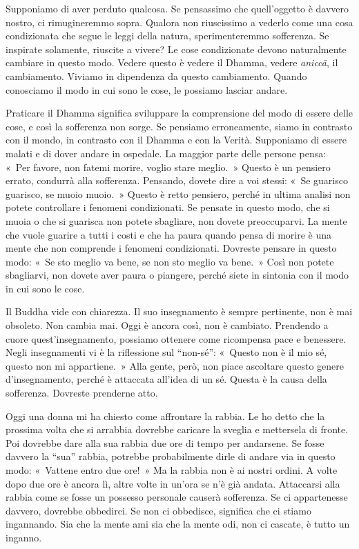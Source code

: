 Supponiamo di aver perduto qualcosa. Se pensassimo che quell'oggetto è
davvero nostro, ci rimugineremmo sopra. Qualora non riuscissimo a
vederlo come una cosa condizionata che segue le leggi della natura,
sperimenteremmo sofferenza. Se inspirate solamente, riuscite a vivere?
Le cose condizionate devono naturalmente cambiare in questo modo. Vedere
questo è vedere il Dhamma, vedere \emph{aniccā}, il cambiamento. Viviamo
in dipendenza da questo cambiamento. Quando conosciamo il modo in cui
sono le cose, le possiamo lasciar andare.

Praticare il Dhamma significa sviluppare la comprensione del modo di
essere delle cose, e così la sofferenza non sorge. Se pensiamo
erroneamente, siamo in contrasto con il mondo, in contrasto con il
Dhamma e con la Verità. Supponiamo di essere malati e di dover andare in
ospedale. La maggior parte delle persone pensa: «~Per favore, non fatemi
morire, voglio stare meglio.~» Questo è un pensiero errato, condurrà
alla sofferenza. Pensando, dovete dire a voi stessi: «~Se guarisco
guarisco, se muoio muoio.~» Questo è retto pensiero, perché in ultima
analisi non potete controllare i fenomeni condizionati. Se pensate in
questo modo, che si muoia o che si guarisca non potete sbagliare, non
dovete preoccuparvi. La mente che vuole guarire a tutti i costi e che ha
paura quando pensa di morire è una mente che non comprende i fenomeni
condizionati. Dovreste pensare in questo modo: «~Se sto meglio va bene,
se non sto meglio va bene.~» Così non potete sbagliarvi, non dovete aver
paura o piangere, perché siete in sintonia con il modo in cui sono le
cose.

Il Buddha vide con chiarezza. Il suo insegnamento è sempre pertinente,
non è mai obsoleto. Non cambia mai. Oggi è ancora così, non è cambiato.
Prendendo a cuore quest'insegnamento, possiamo ottenere come ricompensa
pace e benessere. Negli insegnamenti vi è la riflessione sul ``non-sé'':
«~Questo non è il mio sé, questo non mi appartiene.~» Alla gente, però,
non piace ascoltare questo genere d'insegnamento, perché è attaccata
all'idea di un sé. Questa è la causa della sofferenza. Dovreste
prenderne atto.

Oggi una donna mi ha chiesto come affrontare la rabbia. Le ho detto che
la prossima volta che si arrabbia dovrebbe caricare la sveglia e
mettersela di fronte. Poi dovrebbe dare alla sua rabbia due ore di tempo
per andarsene. Se fosse davvero la ``sua'' rabbia, potrebbe
probabilmente dirle di andare via in questo modo: «~Vattene entro due
ore!~» Ma la rabbia non è ai nostri ordini. A volte dopo due ore è
ancora lì, altre volte in un'ora se n'è già andata. Attaccarsi alla
rabbia come se fosse un possesso personale causerà sofferenza. Se ci
appartenesse davvero, dovrebbe obbedirci. Se non ci obbedisce, significa
che ci stiamo ingannando. Sia che la mente ami sia che la mente odi, non
ci cascate, è tutto un inganno.

